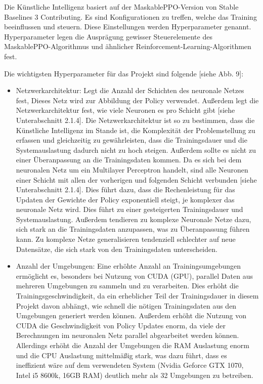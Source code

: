 Die Künstliche Intelligenz basiert auf der MaskablePPO-Version von Stable Baselines 3 Contributing. Es sind Konfigurationen zu treffen, welche das Training beeinflussen und steuern. Diese Einstellungen werden Hyperparameter genannt. Hyperparameter legen die Ausprägung gewisser Steuerelemente des MaskablePPO-Algorithmus und ähnlicher Reinforcement-Learning-Algorithmen fest.

Die wichtigsten Hyperparameter für das Projekt sind folgende [siehe Abb. 9]:

\begin{itemize} 
\item Netzwerkarchitektur: Legt die Anzahl der Schichten des neuronale Netzes fest, Dieses Netz wird zur Abbildung der Policy verwendet. Außerdem legt die Netzwerkarchitektur fest, wie viele Neuronen es pro Schicht gibt [siehe Unterabschnitt 2.1.4]. Die Netzwerkarchitektur ist so zu bestimmen, dass die Künstliche Intelligenz im Stande ist, die Komplexität der Problemstellung zu erfassen und gleichzeitig zu gewährleisten, dass die Trainingsdauer und die Systemauslastung dadurch nicht zu hoch steigen. Außerdem sollte es nicht zu einer Überanpassung an die Trainingsdaten kommen. Da es sich bei dem neuronalen Netz um ein Multilayer Perceptron handelt, sind alle Neuronen einer Schicht mit allen der vorherigen und folgenden Schicht verbunden [siehe Unterabschnitt 2.1.4]. Dies führt dazu, dass die Rechenleistung für das Updaten der Gewichte der Policy exponentiell steigt, je komplexer das neuronale Netz wird. Dies führt zu einer gesteigerten Trainingsdauer und Systemauslastung. Außerdem tendieren zu komplexe Neuronale Netze dazu, sich stark an die Trainingsdaten anzupassen, was zu Überanpassung führen kann. Zu komplexe Netze generalisieren tendenziell schlechter auf neue Datensätze, die sich stark von den Trainingsdaten unterscheiden.

\item Anzahl der Umgebungen: Eine erhöhte Anzahl an Trainingsumgebungen ermöglicht es, besonders bei Nutzung von CUDA (GPU), parallel Daten aus mehreren Umgebungen zu sammeln und zu verarbeiten. Dies erhöht die Trainingsgeschwindigkeit, da ein erheblicher Teil der Trainingsdauer in diesem Projekt davon abhängt, wie schnell die nötigen Trainingsdaten aus den Umgebungen generiert werden können. Außerdem erhöht die Nutzung von CUDA die Geschwindigkeit von Policy Updates enorm, da viele der Berechnungen im neuronalen Netz parallel abgearbeitet werden können. Allerdings erhöht die Anzahl der Umgebungen die RAM Auslastung enorm und die CPU Auslastung mittelmäßig stark, was dazu führt, dass es ineffizient wäre auf dem verwendeten System (Nvidia Geforce GTX 1070, Intel i5 8600k, 16GB RAM) deutlich mehr als 32 Umgebungen zu betreiben.


\end{itemize}
